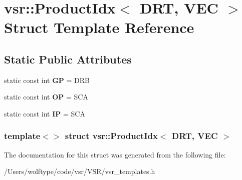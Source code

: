 \hypertarget{structvsr_1_1_product_idx_3_01_d_r_t_00_01_v_e_c_01_4}{\section{vsr\-:\-:Product\-Idx$<$ D\-R\-T, V\-E\-C $>$ Struct Template Reference}
\label{structvsr_1_1_product_idx_3_01_d_r_t_00_01_v_e_c_01_4}
}
\subsection*{Static Public Attributes}
\begin{DoxyCompactItemize}
\item 
\hypertarget{structvsr_1_1_product_idx_3_01_d_r_t_00_01_v_e_c_01_4_afc8398e55a565c6168c8db3b574d030e}{static const int {\bfseries G\-P} = D\-R\-B}\label{structvsr_1_1_product_idx_3_01_d_r_t_00_01_v_e_c_01_4_afc8398e55a565c6168c8db3b574d030e}

\item 
\hypertarget{structvsr_1_1_product_idx_3_01_d_r_t_00_01_v_e_c_01_4_a67246ac01cc2a35373fea1d03897c8c6}{static const int {\bfseries O\-P} = S\-C\-A}\label{structvsr_1_1_product_idx_3_01_d_r_t_00_01_v_e_c_01_4_a67246ac01cc2a35373fea1d03897c8c6}

\item 
\hypertarget{structvsr_1_1_product_idx_3_01_d_r_t_00_01_v_e_c_01_4_a59e7a06b2fface74995c1f50dda28059}{static const int {\bfseries I\-P} = S\-C\-A}\label{structvsr_1_1_product_idx_3_01_d_r_t_00_01_v_e_c_01_4_a59e7a06b2fface74995c1f50dda28059}

\end{DoxyCompactItemize}
\subsubsection*{template$<$$>$ struct vsr\-::\-Product\-Idx$<$ D\-R\-T, V\-E\-C $>$}



The documentation for this struct was generated from the following file\-:\begin{DoxyCompactItemize}
\item 
/\-Users/wolftype/code/vsr/\-V\-S\-R/vsr\-\_\-templates.\-h\end{DoxyCompactItemize}
